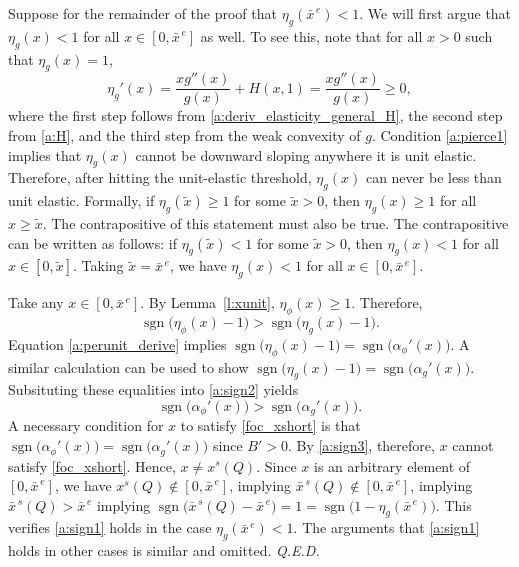 \documentclass[12pt]{article}
\DeclareMathOperator*{\sgn}{sgn}
\renewcommand{\qed}{{\it Q.E.D.}}
\newcommand{\efficacy}{\phi}
\newcommand{\general}{g}
\newcommand{\benefit}{B}
\newcommand{\xshort}{x^{s}}
\newcommand{\xshortbar}{\bar{x}^{\,s}}
\newcommand{\xunitbar}{\bar{x}^{\,e}}
\newcommand{\elasticity}[1]{\eta_{#1}}
\newcommand{\perunit}[1]{\alpha_{#1}}
\newcommand{\xtilde}{\tilde{x}}
\begin{document}
Suppose for the remainder of the proof that
$\elasticity{\general}\!(\xunitbar) < 1$. We will first argue that
$\elasticity{\general}\!(x) < 1$ for all $x \in [0, \xunitbar]$ as
well. To see this, note that for all $x > 0$ such that
$\elasticity{\general}\!(x) = 1$,
\begin{equation}
\label{a:pierce1}
\elasticity{\general}'\!(x) = \frac{x \general''(x)}{\general(x)} +
H(x, 1) = \frac{x \general''(x)}{\general(x)} \geq 0,
\end{equation}
where the first step follows from
\eqref{a:deriv_elasticity_general_H}, the second step from
\eqref{a:H}, and the third step from the weak convexity of
$\general$. Condition \eqref{a:pierce1} implies that
$\elasticity{\general}(x)$ cannot be downward sloping anywhere it is
unit elastic. Therefore, after hitting the unit-elastic threshold,
$\elasticity{\general}(x)$ can never be less than unit
elastic. Formally, if $\elasticity{\general}\!(\xtilde) \geq 1$ for
some $\xtilde > 0$, then $\elasticity{\general}\!(x) \geq 1$ for all
$x \geq \xtilde$. The contrapositive of this statement must also be
true. The contrapositive can be written as follows: if
$\elasticity{\general}\!(\xtilde) < 1$ for some $\xtilde > 0$, then
$\elasticity{\general}\!(x) < 1$ for all $x \in [0, \xtilde]$. Taking
$\xtilde = \xunitbar$, we have $\elasticity{\general}\!(x) < 1$ for
all $x \in [0, \xunitbar]$.

Take any $x \in [0, \xunitbar]$. By Lemma~\ref{l:xunit},
$\elasticity{\efficacy}\!(x) \geq 1$. Therefore,
\begin{equation}
\label{a:sign2}
\sgn \bigl( \elasticity{\efficacy}\! (x) - 1 \bigr) > \sgn \bigl(
\elasticity{\general}\! (x) - 1 \bigr).
\end{equation}
Equation \eqref{a:perunit_derive} implies $\sgn
\bigl(\elasticity{\efficacy}\! (x) - 1 \bigr) = \sgn \bigl(
\perunit{\efficacy}'\!(x) \bigr)$. A similar calculation can be used
to show $\sgn \bigl(\elasticity{\general}\! (x) - 1 \bigr) = \sgn
\bigl( \perunit{\general}'\!(x) \bigr)$. Subsituting these equalities
into \eqref{a:sign2} yields
\begin{equation}
\label{a:sign3}
\sgn \bigl(\perunit{\efficacy}'\!(x) \bigr) > \sgn \bigl(
\perunit{\general}'\!(x) \bigr).
\end{equation}
A necessary condition for $x$ to satisfy \eqref{foc_xshort} is that
$\sgn \bigl(\perunit{\efficacy}'\!(x) \bigr) = \sgn \bigl(
\perunit{\general}'\!(x) \bigr)$ since $\benefit' > 0$. By
\eqref{a:sign3}, therefore, $x$ cannot satisfy
\eqref{foc_xshort}. Hence, $x \neq \xshort\!(Q)$. Since $x$ is an
arbitrary element of $[0, \xunitbar]$, we have $\xshort\!(Q) \not\in
[0, \xunitbar]$, implying $\xshortbar\!(Q) \not\in [0, \xunitbar]$,
implying $\xshortbar\!(Q) > \xunitbar$ implying $\sgn \bigl(
\xshortbar\!(Q) - \xunitbar \bigr) = 1 = \sgn \bigl( 1 -
\elasticity{\general}\!(\xunitbar) \bigr)$. This verifies
\eqref{a:sign1} holds in the case $\elasticity{\general}\!(\xunitbar)
< 1$. The arguments that \eqref{a:sign1} holds in other cases is
similar and omitted. \qed
\end{document}
